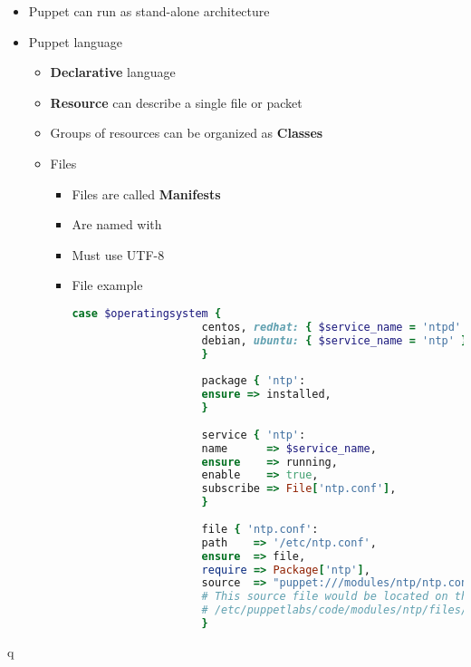 \begin{itemize}
		\item Puppet can run as stand-alone architecture
		\item Puppet language
		\begin{itemize}
			\item \textbf{Declarative} language
			\item \textbf{Resource} can describe a single file or packet
			\item Groups of resources can be organized as \textbf{Classes}
			\item Files
			\begin{itemize}
				\item Files are called \textbf{Manifests}
				\item Are named with 
				\item Must use UTF-8
				\item File example
				\begin{lstlisting}[language=Ruby]
					case $operatingsystem {
					centos, redhat: { $service_name = 'ntpd' }
					debian, ubuntu: { $service_name = 'ntp' }
					}
					
					package { 'ntp':
					ensure => installed,
					}
					
					service { 'ntp':
					name      => $service_name,
					ensure    => running,
					enable    => true,
					subscribe => File['ntp.conf'],
					}
					
					file { 'ntp.conf':
					path    => '/etc/ntp.conf',
					ensure  => file,
					require => Package['ntp'],
					source  => "puppet:///modules/ntp/ntp.conf",
					# This source file would be located on the Puppet master at
					# /etc/puppetlabs/code/modules/ntp/files/ntp.conf
					}
				\end{lstlisting}
			\end{itemize}
		\end{itemize}
	\end{itemize}
q